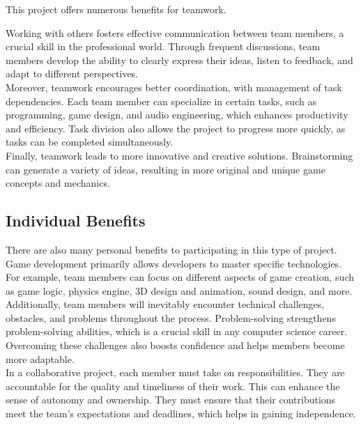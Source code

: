 \documentclass{article}
\begin{document}
This project offers numerous benefits for teamwork.

Working with others fosters effective communication between team members, a crucial skill in the professional world. Through frequent discussions, team members develop the ability to clearly express their ideas, listen to feedback, and adapt to different perspectives.\\

Moreover, teamwork encourages better coordination, with management of task dependencies. Each team member can specialize in certain tasks, such as programming, game design, and audio engineering, which enhances productivity and efficiency. Task division also allows the project to progress more quickly, as tasks can be completed simultaneously.\\

Finally, teamwork leads to more innovative and creative solutions. Brainstorming can generate a variety of ideas, resulting in more original and unique game concepts and mechanics.





\subsection{Individual Benefits}\hfill

There are also many personal benefits to participating in this type of project.\\

Game development primarily allows developers to master specific technologies. For example, team members can focus on different aspects of game creation, such as game logic, physics engine, 3D design and animation, sound design, and more.\\

Additionally, team members will inevitably encounter technical challenges, obstacles, and problems throughout the process. Problem-solving strengthens problem-solving abilities, which is a crucial skill in any computer science career. Overcoming these challenges also boosts confidence and helps members become more adaptable.\\

In a collaborative project, each member must take on responsibilities. They are accountable for the quality and timeliness of their work. This can enhance the sense of autonomy and ownership. They must ensure that their contributions meet the team's expectations and deadlines, which helps in gaining independence.\\
\end{document}

